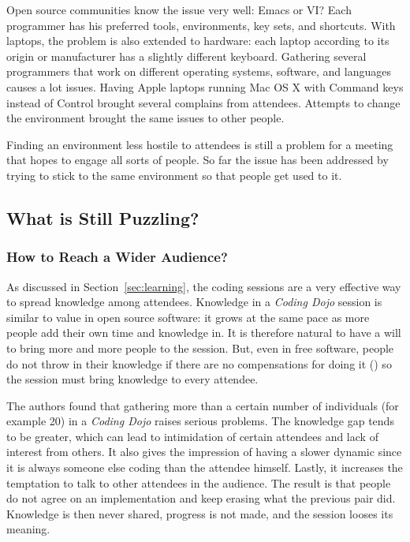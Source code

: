 Open source communities know the issue very well: Emacs or VI? Each programmer
has his preferred tools, environments, key sets, and
shortcuts. With laptops, the problem is also extended to hardware:
each laptop according to its origin or manufacturer has a slightly
different keyboard. Gathering several programmers that work on
different operating systems, software, and languages causes a lot
issues. Having Apple laptops running Mac OS X with Command keys
instead of Control brought several complains from attendees. Attempts
to change the environment brought the same issues to other people.

Finding an environment less hostile to attendees is still a problem
for a meeting that hopes to engage all sorts of people. So far the
issue has been addressed by trying to stick to the same environment so
that people get used to it.

\subsection{What is Still Puzzling?}\label{ssub:puzzles}


\subsubsection{How to Reach a Wider Audience?}

As discussed in Section~\ref{sec:learning}, the coding sessions
are a very effective way to spread knowledge among attendees. Knowledge in a
\emph{Coding Dojo} session is similar to value in open source
software: it grows at the same pace as more people add their own time
and knowledge in. It is therefore natural to have a will to bring more
and more people to the session. But, even in free software, people do not
throw in their knowledge if there are no compensations for doing it
(\cite{RishabGhosh}) so the session must bring knowledge to every
attendee.

The authors found that gathering more than a certain number of
individuals (for example 20) in a \emph{Coding Dojo} raises serious
problems. The knowledge gap tends to be greater, which can lead to
intimidation of certain attendees and lack of interest from others. It
also gives the impression of having a slower dynamic since it is
always someone else coding than the attendee himself. Lastly, it
increases the temptation to talk to other attendees in the
audience. The result is that people do not agree on an implementation
and keep erasing what the previous pair did. Knowledge is then never
shared, progress is not made, and the session looses its meaning.

